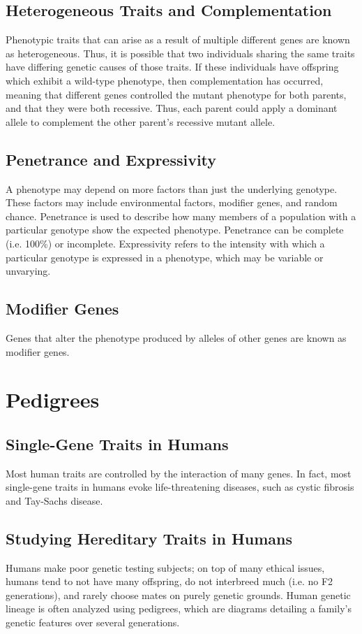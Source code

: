 \documentclass[12pt,titlepage]{article}
\begin{document}
    \subsection{Heterogeneous Traits and Complementation}
      Phenotypic traits that can arise as a result of multiple different genes are known as heterogeneous. Thus, it is possible that two individuals
      sharing the same traits have differing genetic causes of those traits. If these individuals have offspring which exhibit a wild-type phenotype, then
      complementation has occurred, meaning that different genes controlled the mutant phenotype for both parents, and that they were both recessive. Thus,
      each parent could apply a dominant allele to complement the other parent's recessive mutant allele.

    \subsection{Penetrance and Expressivity}
      A phenotype may depend on more factors than just the underlying genotype. These factors may include environmental factors, modifier genes, and random
      chance. Penetrance is used to describe how many members of a population with a particular genotype show the expected phenotype. Penetrance can be complete
      (i.e. 100\%) or incomplete. Expressivity refers to the intensity with which a particular genotype is expressed in a phenotype, which may be variable or
      unvarying.

    \subsection{Modifier Genes}
      Genes that alter the phenotype produced by alleles of other genes are known as modifier genes.

  \newpage

  \section{Pedigrees}
    \subsection{Single-Gene Traits in Humans}
      Most human traits are controlled by the interaction of many genes. In fact, most single-gene traits in humans evoke life-threatening diseases, such as
      cystic fibrosis and Tay-Sachs disease.

    \subsection{Studying Hereditary Traits in Humans}
      Humans make poor genetic testing subjects; on top of many ethical issues, humans tend to not have many offspring, do not interbreed much
      (i.e. no F2 generations), and rarely choose mates on purely genetic grounds. Human genetic lineage is often analyzed using pedigrees, which
      are diagrams detailing a family's genetic features over several generations.
\end{document}

